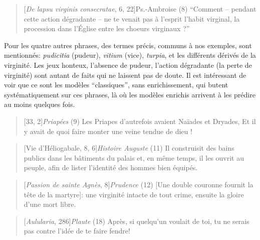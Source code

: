 \begin{quote}[\textit{De lapsu virginis consecratae}, 6, 22]{Ps.-Ambroise}
	(8) \enquote{Comment – pendant cette action dégradante – ne te venait pas à l’esprit l’habit virginal, la procession dans l’Église entre les choeurs virginaux ?}
\end{quote}

Pour les quatre autres phrases, des termes précis, communs à nos exemples, sont mentionnés: \textit{pudicitia} (pudeur), \textit{vitium} (vice), \textit{turpia}, et les différents dérivés de la virginité. Les jeux honteux, l'absence de pudeur, l'action dégradante (la perte de virginité) sont autant de faits qui ne laissent pas de doute. Il est intéressant de voir que ce sont les modèles \enquote{classiques}, sans enrichissement, qui butent systématiquement sur ces phrases, là où les modèles enrichis arrivent à les prédire au moins quelques fois.

\starbreak

\begin{quote}[33, 2]{\textit{Priapées}}
    (9) Les Priapes d’autrefois avaient Naïades et Dryades, Et il y avait de quoi faire monter une veine tendue de dieu !
\end{quote}

\begin{quote}[Vie d'Héliogabale, 8, 6]{\textit{Histoire Auguste}}
    (11) Il construisit des bains publics dans les bâtiments du palais et, en même temps, il les ouvrit au peuple, afin de lister l'identité des hommes bien équipés.
\end{quote}
\begin{quote}[\textit{Passion de sainte Agnès}, 8]{\textit{Prudence}}
    (12) [Une double couronne fournit la tête de la martyre]: une virginité intacte de tout crime, ensuite la gloire d'une mort libre.
\end{quote}
\begin{quote}[\textit{Aulularia}, 286]{\textit{Plaute}}
    (18) Après, si quelqu’un voulait de toi, tu ne serais pas contre l'idée de te faire fendre!
\end{quote}

